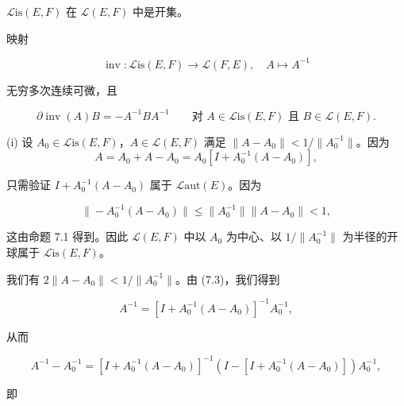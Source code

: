 \begin{proposition}

\begin{subitems}
\item

$ \mathcal{L}\mathrm{is}(E, F) $ 在 $ \mathcal{L}(E, F) $ 中是开集。

\item

映射

\[
\operatorname{inv} : \mathcal{L}\mathrm{is}(E, F) \to \mathcal{L}(F, E) , \quad A \mapsto A^{-1}
\]

无穷多次连续可微，且

\begin{equation}
\partial\operatorname{inv}(A)B = -A^{-1}BA^{-1} \qquad \text{对 } A \in \mathcal{L}\mathrm{is}(E, F) \text{ 且 } B \in \mathcal{L}(E, F) .\tag{7.2}
\end{equation}

\proofhead
(i) 设 $ A_{0} \in \mathcal{L}\mathrm{is}(E, F) $，$ A \in \mathcal{L}(E, F) $ 满足 $ \|A - A_{0}\| < 1/\|A_{0}^{-1}\| $。因为
\begin{equation}
A = A_{0} + A - A_{0} = A_{0}\left[I + A_{0}^{-1}(A - A_{0})\right] ,\tag{7.3}
\end{equation}

只需验证 $ I + A_{0}^{-1}(A - A_{0}) $ 属于 $ \mathcal{L}\mathrm{aut}(E) $。因为

\[
\|-A_{0}^{-1}(A - A_{0})\| \le \|A_{0}^{-1}\|\|A - A_{0}\| < 1 ,
\]

这由命题 7.1 得到。因此 $ \mathcal{L}(E, F) $ 中以 $ A_{0} $ 为中心、以 $ 1/\|A_{0}^{-1}\| $ 为半径的开球属于 $ \mathcal{L}\mathrm{is}(E, F) $。

\end{subitems}

\begin{subitems}
\item[（ii）]

我们有 $ 2\|A - A_{0}\| < 1/\|A_{0}^{-1}\| $。由 (7.3)，我们得到

\[
A^{-1} = \left[I + A_{0}^{-1}(A - A_{0})\right]^{-1}A_{0}^{-1} ,
\]

从而

\[
A^{-1} - A_{0}^{-1} = \left[I + A_{0}^{-1}(A - A_{0})\right]^{-1}\left(I - \left[I + A_{0}^{-1}(A - A_{0})\right]\right)A_{0}^{-1} ,
\]

即


\end{subitems}
\end{proposition}
